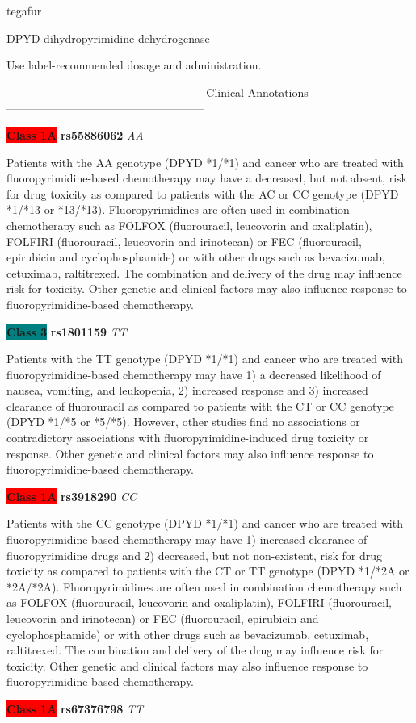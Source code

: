 \documentclass{resume} %
\begin{document}
\begin{rSection}{ tegafur }
\begin{rSubsection}{ DPYD }{ dihydropyrimidine dehydrogenase }{}{}
\item[] Use label-recommended dosage and administration.
\item[] ---------------------------------------------------- Clinical Annotations -----------------------------------------------------\newline
\item \textbf{\colorbox{red} {Class 1A}} \textbf{ rs55886062 } \textit{ AA }
\item[] Patients with the AA genotype (DPYD *1/*1) and cancer who are treated with fluoropyrimidine-based chemotherapy may have a decreased, but not absent, risk for drug toxicity as compared to patients with the AC or CC genotype (DPYD *1/*13 or *13/*13). Fluoropyrimidines are often used in combination chemotherapy such as FOLFOX (fluorouracil, leucovorin and oxaliplatin), FOLFIRI (fluorouracil, leucovorin and irinotecan) or FEC (fluorouracil, epirubicin and cyclophosphamide) or with other drugs such as bevacizumab, cetuximab, raltitrexed. The combination and delivery of the drug may influence risk for toxicity. Other genetic and clinical factors may also influence response to fluoropyrimidine-based chemotherapy.\item \textbf{\colorbox{teal} {Class 3}} \textbf{ rs1801159 } \textit{ TT }
\item[] Patients with the TT genotype (DPYD *1/*1) and cancer who are treated with fluoropyrimidine-based chemotherapy may have 1) a decreased likelihood of nausea, vomiting, and leukopenia, 2) increased response and 3) increased clearance of fluorouracil as compared to patients with the CT or CC genotype (DPYD *1/*5 or *5/*5). However, other studies find no associations or contradictory associations with fluoropyrimidine-induced drug toxicity or response. Other genetic and clinical factors may also influence response to fluoropyrimidine-based chemotherapy.\item \textbf{\colorbox{red} {Class 1A}} \textbf{ rs3918290 } \textit{ CC }
\item[] Patients with the CC genotype (DPYD *1/*1) and cancer who are treated with fluoropyrimidine-based chemotherapy may have 1) increased clearance of fluoropyrimidine drugs and 2) decreased, but not non-existent, risk for drug toxicity as compared to patients with the CT or TT genotype (DPYD *1/*2A or *2A/*2A). Fluoropyrimidines are often used in combination chemotherapy such as FOLFOX (fluorouracil, leucovorin and oxaliplatin), FOLFIRI (fluorouracil,  leucovorin and irinotecan) or FEC (fluorouracil, epirubicin and cyclophosphamide) or with other drugs such as bevacizumab, cetuximab, raltitrexed. The combination and delivery of the drug may influence risk for toxicity. Other genetic and clinical factors may also influence response to fluoropyrimidine based chemotherapy.\item \textbf{\colorbox{red} {Class 1A}} \textbf{ rs67376798 } \textit{ TT }

\end{rSubsection}
\end{rSection}
\end{document}
